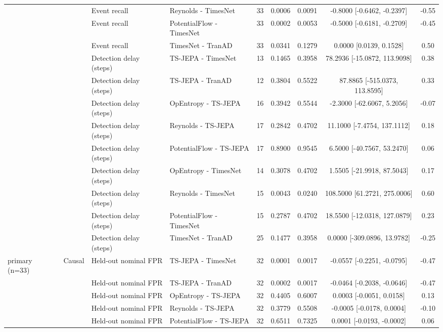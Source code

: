 {\begin{longtable}{@{}llllccccc@{}}
 &  & Event recall & Reynolds - TimesNet & 33 & 0.0006 & 0.0091 & -0.8000 [-0.6462, -0.2397] & -0.55 \\
 &  & Event recall & PotentialFlow - TimesNet & 33 & 0.0002 & 0.0053 & -0.5000 [-0.6181, -0.2709] & -0.45 \\
 &  & Event recall & TimesNet - TranAD & 33 & 0.0341 & 0.1279 & 0.0000 [0.0139, 0.1528] & 0.50 \\
 &  & Detection delay (steps) & TS-JEPA - TimesNet & 13 & 0.1465 & 0.3958 & 78.2936 [-15.0872, 113.9098] & 0.38 \\
 &  & Detection delay (steps) & TS-JEPA - TranAD & 12 & 0.3804 & 0.5522 & 87.8865 [-515.0373, 113.8595] & 0.33 \\
 &  & Detection delay (steps) & OpEntropy - TS-JEPA & 16 & 0.3942 & 0.5544 & -2.3000 [-62.6067, 5.2056] & -0.07 \\
 &  & Detection delay (steps) & Reynolds - TS-JEPA & 17 & 0.2842 & 0.4702 & 11.1000 [-7.4754, 137.1112] & 0.18 \\
 &  & Detection delay (steps) & PotentialFlow - TS-JEPA & 17 & 0.8900 & 0.9545 & 6.5000 [-40.7567, 53.2470] & 0.06 \\
 &  & Detection delay (steps) & OpEntropy - TimesNet & 14 & 0.3078 & 0.4702 & 1.5505 [-21.9918, 87.5043] & 0.17 \\
 &  & Detection delay (steps) & Reynolds - TimesNet & 15 & 0.0043 & 0.0240 & 108.5000 [61.2721, 275.0006] & 0.60 \\
 &  & Detection delay (steps) & PotentialFlow - TimesNet & 15 & 0.2787 & 0.4702 & 18.5500 [-12.0318, 127.0879] & 0.23 \\
 &  & Detection delay (steps) & TimesNet - TranAD & 25 & 0.1477 & 0.3958 & 0.0000 [-309.0896, 13.9782] & -0.25 \\
\midrule
primary (n=33) & Causal & Held-out nominal FPR & TS-JEPA - TimesNet & 32 & 0.0001 & 0.0017 & -0.0557 [-0.2251, -0.0795] & -0.47 \\
 &  & Held-out nominal FPR & TS-JEPA - TranAD & 32 & 0.0002 & 0.0017 & -0.0464 [-0.2038, -0.0646] & -0.47 \\
 &  & Held-out nominal FPR & OpEntropy - TS-JEPA & 32 & 0.4405 & 0.6007 & 0.0003 [-0.0051, 0.0158] & 0.13 \\
 &  & Held-out nominal FPR & Reynolds - TS-JEPA & 32 & 0.3779 & 0.5508 & -0.0005 [-0.0178, 0.0004] & -0.10 \\
 &  & Held-out nominal FPR & PotentialFlow - TS-JEPA & 32 & 0.6511 & 0.7325 & 0.0001 [-0.0193, -0.0002] & 0.06 \\

\end{longtable}}
